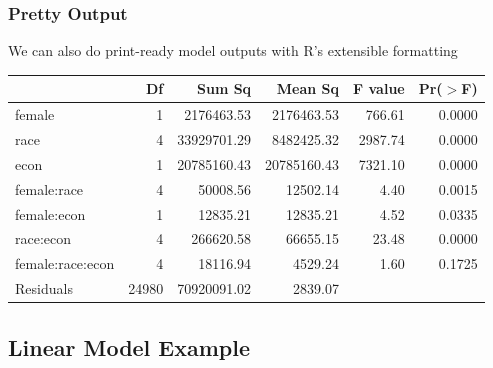 \documentclass{beamer}
\begin{document}
\begin{frame}
\frametitle{Pretty Output}
We can also do print-ready model outputs with R's extensible formatting
\begin{table}[ht]
\begin{center}
\begin{tabular}{lrrrrr}
  \hline
 & Df & Sum Sq & Mean Sq & F value & Pr($>$F) \\ 
  \hline
female           & 1 & 2176463.53 & 2176463.53 & 766.61 & 0.0000 \\ 
  race             & 4 & 33929701.29 & 8482425.32 & 2987.74 & 0.0000 \\ 
  econ             & 1 & 20785160.43 & 20785160.43 & 7321.10 & 0.0000 \\ 
  female:race      & 4 & 50008.56 & 12502.14 & 4.40 & 0.0015 \\ 
  female:econ      & 1 & 12835.21 & 12835.21 & 4.52 & 0.0335 \\ 
  race:econ        & 4 & 266620.58 & 66655.15 & 23.48 & 0.0000 \\ 
  female:race:econ & 4 & 18116.94 & 4529.24 & 1.60 & 0.1725 \\ 
  Residuals        & 24980 & 70920091.02 & 2839.07 &  &  \\ 
   \hline
\end{tabular}
\end{center}
\end{table}\end{frame}

\subsection{Linear Model Example}
\end{document}
